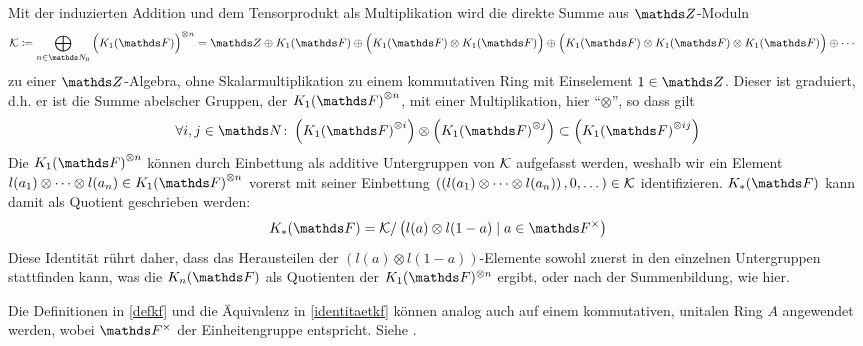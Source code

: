 \documentclass[ngerman,fontsize=11pt, paper=a4, parskip=half, titlepage=true, toc=bib]{scrartcl}
\begin{document}
\begin{Bem}\label{identitaetkf}
  Mit der induzierten Addition und dem Tensorprodukt als
  Multiplikation wird die direkte Summe aus $\Z$-Moduln
  \begin{align*}
    \calK &\coloneqq
            \bigoplus_{n\in\N_0}{\Big(\K_1(\F)\Big)}^{\otimes n}%
                = \Z\oplus\K_1(\F)
                \oplus\Big(\K_1(\F)\otimes\K_1(\F)\Big)
                \oplus\Big(\K_1(\F)\otimes\K_1(\F)\otimes\K_1(\F)\Big)
                \oplus\dotsb
  \end{align*}
  zu einer $\Z$-Algebra, 
  ohne Skalarmultiplikation zu einem kommutativen Ring mit Einselement
  $1\in\Z$.
  Dieser ist graduiert, d.h. er ist die Summe abelscher Gruppen, 
  der ${\K_1(\F)}^{\otimes n}$, mit einer Multiplikation, hier
  \enquote{$\otimes$}, so dass gilt
  \begin{gather*}
    \forall i,j\in \N\colon 
    \left( {\K_1(\F)}^{\otimes i} \right) \otimes
    \left( {\K_1(\F)}^{\otimes j} \right)
    \subset \left( {\K_1(\F)}^{\otimes ij} \right)
  \end{gather*}
  Die ${\KoF}^{\otimes n}$ können durch Einbettung als additive 
  Untergruppen von $\mathcal{K}$ aufgefasst
  werden, weshalb wir ein Element
  $l(a_1)\otimes\dotsb\otimes l(a_n)\in {\KoF}^{\otimes n}$
  vorerst mit seiner Einbettung
  $\left(
    \left(l(a_1)\otimes\dotsb\otimes l(a_n)\right),
    0,\dotsc
  \right)\in\mathcal{K}$
  identifizieren.
  $\KF$ kann damit als Quotient geschrieben werden:
  \begin{gather*}
    \KF = \calK / \left(l(a)\otimes l(1-a)\mid a\in\Fx\right)
  \end{gather*}
  Diese Identität rührt daher, dass das Herausteilen 
  der $(l(a)\otimes l(1-a))$-Elemente sowohl zuerst in den einzelnen
  Untergruppen stattfinden kann, was die $\KnF$ als Quotienten der
  $\KoF^{\otimes n}$ ergibt, 
  oder nach der Summenbildung, wie hier.
\end{Bem}

\begin{Bem}
  Die Definitionen in \ref{defkf} und die Äquivalenz in 
  \ref{identitaetkf} können analog auch auf 
  einem kommutativen, unitalen Ring $A$ angewendet werden,
  wobei $\Fx$ der Einheitengruppe entspricht. Siehe \cite{kerzdipl,kerz}.
\end{Bem}
\end{document}
